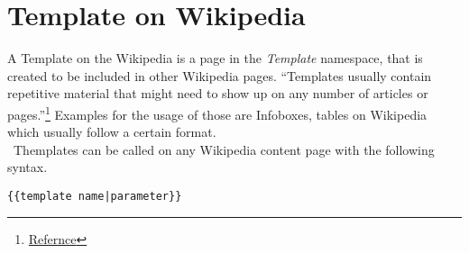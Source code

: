 \section{Template on Wikipedia}

A Template on the Wikipedia is a page in the \textit{Template} namespace, that is created to be included in other Wikipedia pages. ``Templates usually contain repetitive material that might need to show up on any number of articles or pages.''\footnote{\href{https://en.wikipedia.org/wiki/Help:Template}{Refernce}} Examples for the usage of those are Infoboxes, tables on Wikipedia which usually follow a certain format. \\\
Themplates can be called on any Wikipedia content page with the following syntax. \\
\begin{lstlisting}[frame=single] 
{{template name|parameter}}
\end{lstlisting}